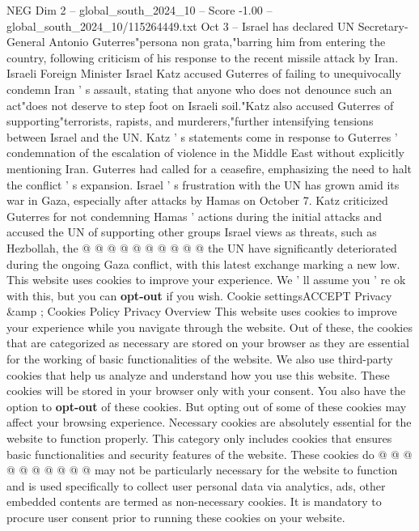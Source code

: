 \begin{textsample}{NEG Dim 2 – global\_south\_2024\_10 – Score -1.00 – global\_south\_2024\_10/115264449.txt}  \label{ex:f2_neg_309}
Oct 3 -- Israel has declared UN Secretary-General Antonio Guterres"persona non grata,"barring him from entering the country, following criticism of his response to the recent missile attack by Iran.
Israeli Foreign Minister Israel Katz accused Guterres of failing to unequivocally condemn Iran ' s assault, stating that anyone who does not denounce such an act"does not deserve to step foot on Israeli soil."Katz also accused Guterres of supporting"terrorists, rapists, and murderers,"further intensifying tensions between Israel and the UN.
Katz ' s statements come in response to Guterres ' condemnation of the escalation of violence in the Middle East without explicitly mentioning Iran.
Guterres had called for a ceasefire, emphasizing the need to halt the conflict ' s expansion.
Israel ' s frustration with the UN has grown amid its war in Gaza, especially after attacks by Hamas on October 7.
Katz criticized Guterres for not condemning Hamas ' actions during the initial attacks and accused the UN of supporting other groups Israel views as threats, such as Hezbollah, the @ @ @ @ @ @ @ @ @ @ the UN have significantly deteriorated during the ongoing Gaza conflict, with this latest exchange marking a new low.
This website uses cookies to improve your experience.
We ' ll assume you ' re ok with this, but you can \textbf{opt-out} if you wish.
Cookie settingsACCEPT Privacy \&amp ; Cookies Policy Privacy Overview This website uses cookies to improve your experience while you navigate through the website.
Out of these, the cookies that are categorized as necessary are stored on your browser as they are essential for the working of basic functionalities of the website.
We also use third-party cookies that help us analyze and understand how you use this website.
These cookies will be stored in your browser only with your consent.
You also have the option to \textbf{opt-out} of these cookies.
But opting out of some of these cookies may affect your browsing experience.
Necessary cookies are absolutely essential for the website to function properly.
This category only includes cookies that ensures basic functionalities and security features of the website.
These cookies do @ @ @ @ @ @ @ @ @ @ may not be particularly necessary for the website to function and is used specifically to collect user personal data via analytics, ads, other embedded contents are termed as non-necessary cookies.
It is mandatory to procure user consent prior to running these cookies on your website.

\end{textsample}
